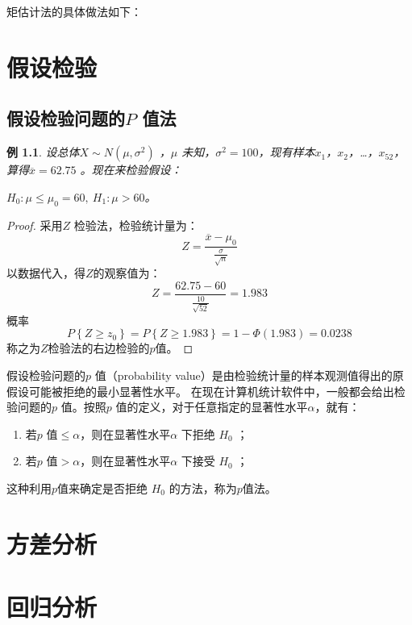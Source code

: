 \documentclass[11pt]{book}
\newtheorem{exercise}{\hspace{2em}\textbf{例}}[section]
\newcounter{#2}
\newcounter{#2}[#1]
\numberwithin{#2}{#1}
\begin{document}
矩估计法的具体做法如下：






	\chapter{假设检验}
	\section{假设检验问题的$ P $ 值法}
	\begin{exercise}
	设总体$ X \sim N(\mu ,\sigma ^{2})$ ，$ \mu $ 未知，$ \sigma ^{2}=100 $，现有样本$ x_1 $，$ x_2 $，\dots ，$ x_{52} $，算得$ \overline{x} = 62.75$ 。现在来检验假设：
	\begin{center}
		$ H_0:\mu \le \mu _0=60,\ H_1 :\mu >60 $。
	\end{center}
\end{exercise}

\begin{proof}
	采用$ Z $ 检验法，检验统计量为：
	\begin{equation*}
		Z=\frac{\overline{x} - \mu_0}{\frac{\sigma}{\sqrt{n}}}
	\end{equation*}
	以数据代入，得$Z$的观察值为：
	\begin{equation*}
		Z=\frac{62.75 - 60}{\frac{10}{\sqrt{52}}}=1.983
	\end{equation*}
	概率
	\begin{equation*}
		P\left\lbrace Z \ge z_0\right\rbrace =P\left\lbrace Z\ge1.983\right\rbrace =1-\Phi(1.983)=0.0238
	\end{equation*}
	称之为$Z$检验法的右边检验的$p$值。
\end{proof}
\begin{newdef}
	假设检验问题的$ p $ 值（probability value）是由检验统计量的样本观测值得出的原假设可能被拒绝的最小显著性水平。
	在现在计算机统计软件中，一般都会给出检验问题的$ p $ 值。按照$ p $ 值的定义，对于任意指定的显著性水平$ \alpha $，就有：
	
	\begin{enumerate}
		\item 若$ p $ 值$ \le \alpha $，则在显著性水平$ \alpha $ 下拒绝 $ H_0 $ ；
		\item 若$ p $ 值$ > \alpha $，则在显著性水平$ \alpha $ 下接受 $ H_0 $ ；
	\end{enumerate}
这种利用$p$值来确定是否拒绝 $ H_0 $ 的方法，称为$p$值法。
\end{newdef}


	\chapter{方差分析}
	\chapter{回归分析}
	
	
\end{document}
